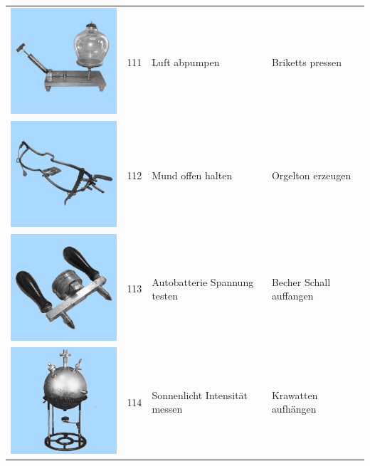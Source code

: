 \documentclass[
  english,
  doc,12pt,twoside,floatsintext]{apa7}
\begin{document}
\begin{center}
\begin{ThreePartTable}
\begin{longtable}{llll}
\includegraphics[valign=c, scale=0.19]{../materials/unfamiliar/111.png} & 111 & Luft abpumpen & Briketts pressen\\
\includegraphics[valign=c, scale=0.19]{../materials/unfamiliar/112.png} & 112 & Mund offen halten & Orgelton erzeugen\\
\includegraphics[valign=c, scale=0.19]{../materials/unfamiliar/113.png} & 113 & Autobatterie Spannung testen & Becher Schall auffangen\\
\includegraphics[valign=c, scale=0.19]{../materials/unfamiliar/114.png} & 114 & Sonnenlicht Intensität messen & Krawatten aufhängen\\

\end{longtable}
\end{ThreePartTable}
\end{center}
\end{document}
